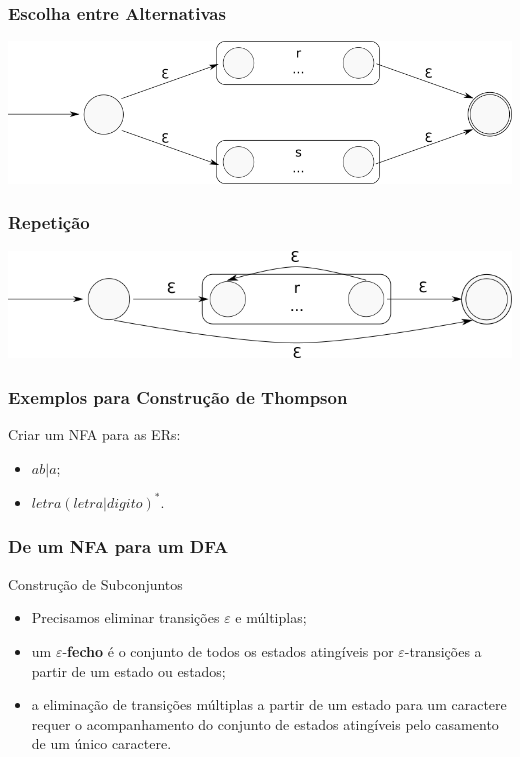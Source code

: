 \documentclass[table]{beamer}
\begin{document}
\begin{frame}
   \frametitle{Escolha entre Alternativas}
   \includegraphics[width=\linewidth,height=\textheight,keepaspectratio]{figuras/alternativas.png}
\end{frame}

\begin{frame}
   \frametitle{Repetição}
   \includegraphics[width=\linewidth,height=\textheight,keepaspectratio]{figuras/repeticao.png}
\end{frame}

\begin{frame}
   \frametitle{Exemplos para Construção de Thompson}
   \begin{block}{Criar um NFA para as ERs:}
      \begin{itemize}
         \item $ab|a$;
         \item $letra(letra|digito)^{*}$.
      \end{itemize}
   \end{block}
\end{frame}

\begin{frame}
   \frametitle{De um NFA para um DFA}
   \begin{block}{Construção de Subconjuntos}
      \begin{itemize}
         \item Precisamos eliminar transições $\varepsilon$ e múltiplas;
	 \item um $\varepsilon$-\textbf{fecho} é o conjunto de todos os estados atingíveis por $\varepsilon$-transições a partir de um estado ou estados;
	 \item a eliminação de transições múltiplas a partir de um estado para um caractere requer o acompanhamento do conjunto de estados atingíveis pelo casamento de um único caractere.
      \end{itemize}
   \end{block}
\end{frame}
\end{document}
